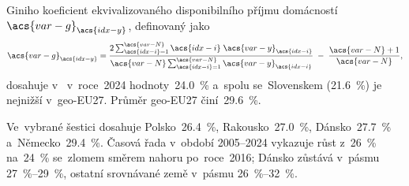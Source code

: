 Giniho koeficient ekvivalizovaného disponibilního příjmu domácností~$\acs{var-g}_{\acs{idx-y}}$, definovaný jako
\begin{equation}\label{eq:gini_y}
  \acs{var-g}_{\acs{idx-y}}
    = \frac{2\sum_{\acs{idx-i}=1}^{\acs{var-N}}
              \acs{idx-i}\;\acs{var-y}_{\acs{idx-i}}}
           {\acs{var-N}\sum_{\acs{idx-i}=1}^{\acs{var-N}}
              \acs{var-y}_{\acs{idx-i}}}
    \;-\; \frac{\acs{var-N}+1}{\acs{var-N}},
\end{equation}
dosahuje v~ v~roce~2024 hodnoty~\SI{24,0}{\percent} a~spolu se~Slovenskem (\SI{21,6}{\percent}) je nejnižší v~\acs{geo-EU27}. Průměr \acs{geo-EU27} činí~\SI{29,6}{\percent}.

Ve~vybrané šestici dosahuje Polsko~\SI{26,4}{\percent}, Rakousko~\SI{27,0}{\percent}, Dánsko~\SI{27,7}{\percent} a~Německo~\SI{29,4}{\percent}. Časová řada  v~období 2005--2024 vykazuje růst z~\SI{26}{\percent} na~\SI{24}{\percent} se~zlomem směrem nahoru po~roce~2016; Dánsko zůstává v~pásmu \SIrange{27}{29}{\percent}, ostatní srovnávané země v~pásmu \SIrange{26}{32}{\percent}.


